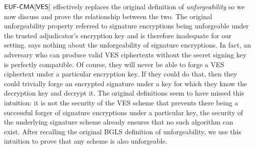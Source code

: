 $\textsf{EUF-CMA}[\textsf{VES}]$ effectively replaces the original definition of \emph{unforgeability} so we now discuss and prove the relationship between the two.
The original unforgeability property referred to signature encryptions being unforgeable under the trusted adjudicator's encryption key and is therefore inadequate for our setting.
\EUFCMAVES says nothing about the unforgeability of signature encryptions.
In fact, an adversary who can produce valid VES ciphertexts without the secret signing key is perfectly compatible. %
Of course, they will never be able to forge a VES ciphertext under a particular encryption key.
If they could do that, then they could trivially forge an encrypted signature under a key for which they know the decryption key and decrypt it.
The original definitions seem to have missed this intuition: it is not the security of the VES scheme that prevents there being a successful forger of signature encryptions under a particular key, the \EUFCMA security of the underlying signature scheme already ensures that no such algorithm can exist.
After recalling the original BGLS definition of unforgeability, we use this intuition to prove that any \EUFCMAVES scheme is also unforgeable.

